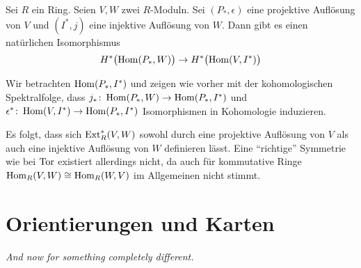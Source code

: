 \begin{satz}[{name=[{Kohomologie von Hom über projektive oder injektive Auflösung}]},label=satz:injektive_aufl_ext]
	Sei $R$ ein Ring.
	Seien $V,W$ zwei $R$-Moduln.
	Sei $(P_*,\epsilon)$ eine projektive Auflösung von $V$ und $(I^*,j)$ eine injektive Auflösung von $W$.
	Dann gibt es einen natürlichen Isomorphismus 
	\[
		H^* \enbrace[\big]{\Hom(P_*,W)} \to H^* \enbrace[\big]{\Hom(V,I^*)}
	\]
\end{satz}
\begin{beweis}
	Wir betrachten $\Hom(P_*,I^*)$ und zeigen wie vorher mit der kohomologischen Spektralfolge, dass $j_* \colon \Hom \enbrace*{P_*,W} \to \Hom(P_*,I^*)$ und $\epsilon^* \colon \Hom(V,I^*) \to \Hom(P_*,I^*)$ Isomorphismen in Kohomologie induzieren.
\end{beweis}

\begin{bemerkung}[{name=[{\enquote{Symmetrie} von Ext}]}]
	Es folgt, dass sich $\Ext_R^*(V,W)$ sowohl durch eine projektive Auflösung von $V$ als auch eine injektive Auflösung von $W$ definieren lässt.
	Eine \enquote{richtige} Symmetrie wie bei $\Tor$ existiert allerdings nicht, da auch für kommutative Ringe $\Hom_R(V,W) \cong \Hom_R(W,V)$ im Allgemeinen nicht stimmt.
\end{bemerkung}
\newpage

\section{Orientierungen und Karten} %
\label{sec:19}

\emph{And now for something completely different.}

